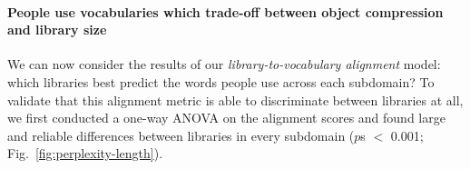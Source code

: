 







\paragraph{People use vocabularies which trade-off between object compression and library size}
We can now consider the results of our \textit{library-to-vocabulary alignment} model: which libraries best predict the words people use across each subdomain? 
To validate that this alignment metric is able to discriminate between libraries at all, we first conducted a one-way ANOVA on the alignment scores and found large and reliable differences between libraries in every subdomain ($p$s $<$ 0.001; Fig.~\ref{fig:perplexity-length}).

